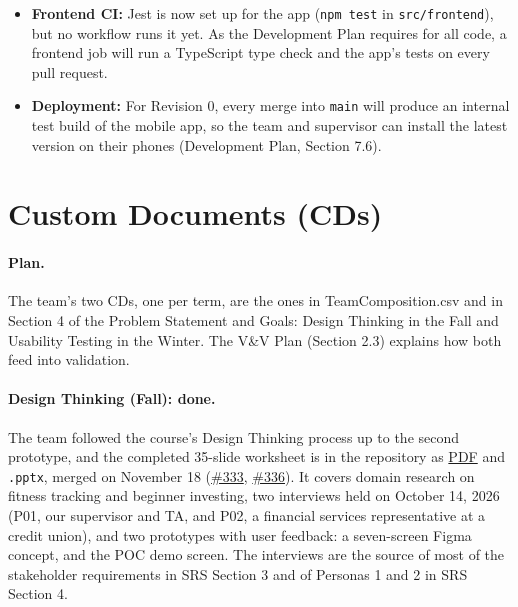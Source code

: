 \documentclass{article}
\begin{document}
\begin{itemize}
\item \textbf{Frontend CI:} Jest is now set up for the app
  (\texttt{npm test} in \texttt{src/frontend}), but no workflow runs it yet.
  As the Development Plan requires for all code, a frontend job will run a
  TypeScript type check and the app's tests on every pull request.
\item \textbf{Deployment:} For Revision 0, every merge into \texttt{main} will
  produce an internal test build of the mobile app, so the team and supervisor
  can install the latest version on their phones (Development Plan,
  Section 7.6).
\end{itemize}

\section{Custom Documents (CDs)}


\paragraph{Plan.} The team's two CDs, one per term, are the ones in
TeamComposition.csv and in Section 4 of the Problem Statement and Goals:
Design Thinking in the Fall and Usability Testing in the Winter. The V\&V
Plan (Section 2.3) explains how both feed into validation.

\paragraph{Design Thinking (Fall): done.} The team followed the course's
Design Thinking process up to the second prototype, and the completed
35-slide worksheet is in the repository as
\href{https://github.com/davislenover/BurnNEarn/blob/main/docs/CDs/DesignThinking/DesignThinkingWorksheet.pdf}{PDF}
and \texttt{.pptx}, merged on November 18
(\href{https://github.com/davislenover/BurnNEarn/pull/333}{\#333},
\href{https://github.com/davislenover/BurnNEarn/pull/336}{\#336}). It covers
domain research on fitness tracking and beginner investing, two interviews
held on October 14, 2026 (P01, our supervisor and TA, and P02, a financial
services representative at a credit union), and two prototypes with user
feedback: a seven-screen Figma concept, and the POC demo screen. The
interviews are the source of most of the stakeholder requirements in SRS
Section 3 and of Personas 1 and 2 in SRS Section 4.
\end{document}
